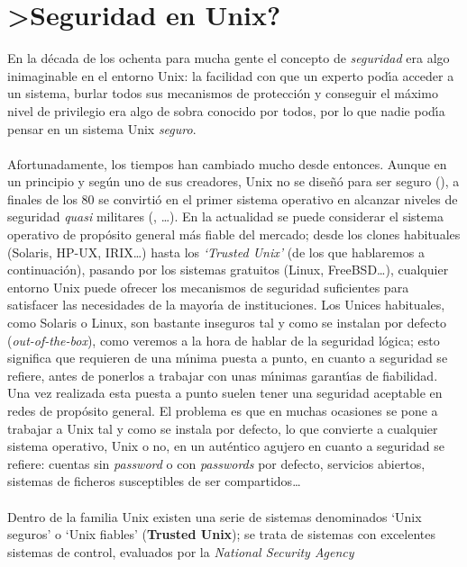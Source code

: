 \section{>Seguridad en Unix?}
En la d\'ecada de los ochenta para mucha gente el concepto de {\it seguridad} 
era algo inimaginable en el entorno Unix: la facilidad con que un experto 
pod\'{\i}a acceder a un sistema, burlar todos sus mecanismos de protecci\'on y 
conseguir el m\'aximo nivel de privilegio era algo de sobra conocido por 
todos, por lo que nadie pod\'{\i}a pensar en un sistema Unix {\it seguro}.\\
\\Afortunadamente, los tiempos han cambiado mucho desde entonces. Aunque en
un principio y seg\'un uno de sus creadores, Unix no se dise\~n\'o para ser 
seguro (\cite{kn:rit86}), a finales de los 80 se convirti\'o en el primer 
sistema operativo en alcanzar niveles de seguridad {\it quasi} militares 
(\cite{kn:hec88}, \cite{kn:ser91}\ldots). En la actualidad se puede considerar 
el sistema operativo 
de prop\'osito general m\'as fiable del mercado; desde los clones habituales 
(Solaris, HP-UX, IRIX\ldots) hasta los {\it `Trusted Unix'} (de los que 
hablaremos a continuaci\'on), pasando por los sistemas gratuitos (Linux, 
FreeBSD\ldots), cualquier entorno Unix puede ofrecer los mecanismos de seguridad
suficientes para satisfacer las necesidades de la mayor\'{\i}a de 
instituciones. Los Unices habituales, como Solaris o Linux, son bastante 
inseguros tal y como
se instalan por defecto ({\it out-of-the-box}), como veremos a la hora de 
hablar de la seguridad l\'ogica; esto significa que requieren de una m\'{\i}nima
puesta a punto, en cuanto a seguridad se refiere, antes de ponerlos a trabajar
con unas m\'{\i}nimas garant\'{\i}as de fiabilidad. Una vez realizada esta 
puesta a punto suelen tener una seguridad aceptable en redes de prop\'osito
general. El problema es que en muchas ocasiones se pone a trabajar a Unix
tal y como se instala por defecto, lo que convierte a cualquier sistema 
o\-pe\-ra\-ti\-vo, Unix o no, en un aut\'entico agujero en cuanto a seguridad 
se refiere: cuentas sin {\it password} o con {\it passwords} por defecto, 
servicios abiertos, sistemas de ficheros susceptibles de ser compartidos\ldots\\
\\Dentro de la familia Unix existen una serie de sistemas denominados `Unix
seguros' o `Unix fia\-bles' ({\bf Trusted Unix}); se trata de sistemas con 
excelentes sistemas de control, evaluados por la {\it National Security Agency}
